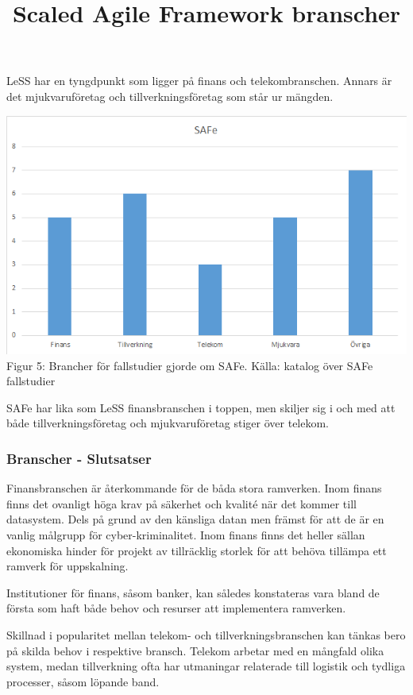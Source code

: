 			LeSS har en tyngdpunkt som ligger på finans och telekombranschen. Annars är det mjukvaruföretag och tillverkningsföretag som står ur mängden.\\		
				
				
			\title{Scaled Agile Framework branscher}
			\begin{center}
				\includegraphics{Grafer/SAFe_brancher.png}
				\\ Figur 5: Brancher för fallstudier gjorde om SAFe. Källa: katalog över SAFe fallstudier \cite{safe_casestudies}
			\end{center}
					
			SAFe har lika som LeSS finansbranschen i toppen, men skiljer sig i och med att både tillverkningsföretag och mjukvaruföretag stiger över telekom.
			
		\subsubsection{Branscher - Slutsatser}
		
			Finansbranschen är återkommande för de båda stora ramverken. Inom finans finns det ovanligt höga krav på säkerhet och kvalité när det kommer till datasystem. Dels på grund av den känsliga datan men främst för att de är en vanlig målgrupp för cyber-kriminalitet. Inom finans finns det heller sällan ekonomiska hinder för projekt av tillräcklig storlek för att behöva tillämpa ett ramverk för uppskalning. 
			
			Institutioner för finans, såsom banker, kan således konstateras vara bland de första som haft både behov och resurser att implementera ramverken.
			
			
			Skillnad i popularitet mellan telekom- och tillverkningsbranschen kan tänkas bero på skilda behov i respektive bransch. Telekom arbetar med en mångfald olika system, medan tillverkning ofta har utmaningar relaterade till logistik och tydliga processer, såsom löpande band.
			
